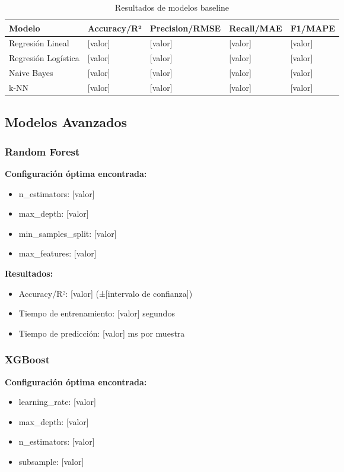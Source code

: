 \begin{table}[htbp]
\centering
\caption{Resultados de modelos baseline}
\begin{tabular}{@{}p{3cm}p{2.5cm}p{2.5cm}p{2.5cm}p{2.5cm}@{}}
\toprule
\textbf{Modelo} & \textbf{Accuracy/R²} & \textbf{Precision/RMSE} & \textbf{Recall/MAE} & \textbf{F1/MAPE} \\
\midrule
Regresión Lineal & [valor] & [valor] & [valor] & [valor] \\
Regresión Logística & [valor] & [valor] & [valor] & [valor] \\
Naive Bayes & [valor] & [valor] & [valor] & [valor] \\
k-NN & [valor] & [valor] & [valor] & [valor] \\
\bottomrule
\end{tabular}
\label{tab:resultados_baseline}
\end{table}

\subsection{Modelos Avanzados}

\subsubsection{Random Forest}

\textbf{Configuración óptima encontrada:}
\begin{itemize}
    \item n\_estimators: [valor]
    \item max\_depth: [valor]
    \item min\_samples\_split: [valor]
    \item max\_features: [valor]
\end{itemize}

\textbf{Resultados:}
\begin{itemize}
    \item Accuracy/R²: [valor] (±[intervalo de confianza])
    \item Tiempo de entrenamiento: [valor] segundos
    \item Tiempo de predicción: [valor] ms por muestra
\end{itemize}

\subsubsection{XGBoost}

\textbf{Configuración óptima encontrada:}
\begin{itemize}
    \item learning\_rate: [valor]
    \item max\_depth: [valor]
    \item n\_estimators: [valor]
    \item subsample: [valor]
\end{itemize}

